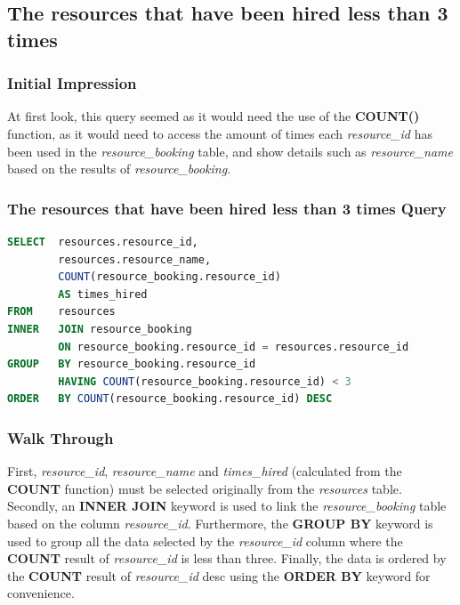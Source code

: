 \documentclass{article}
\begin{document}
\subsection{The resources that have been hired less than 3 times}
\subsubsection{Initial Impression} At first look, this query seemed as it would need the use of the \textbf{COUNT()} function, as it would need to access the amount of times each \textit{resource\_id} has been used in the \textit{resource\_booking} table, and show details such as \textit{resource\_name} based on the results of \textit{resource\_booking}. 

\subsubsection{The resources that have been hired less than 3 times Query}
\begin{lstlisting}[language=sql, caption=The resources that have been hired less than 3 times Query, style=mystyle]
SELECT  resources.resource_id, 
        resources.resource_name, 
        COUNT(resource_booking.resource_id) 
        AS times_hired 
FROM    resources
INNER   JOIN resource_booking 
        ON resource_booking.resource_id = resources.resource_id
GROUP   BY resource_booking.resource_id 
        HAVING COUNT(resource_booking.resource_id) < 3
ORDER   BY COUNT(resource_booking.resource_id) DESC
\end{lstlisting} 

\subsubsection{Walk Through} First, \textit{resource\_id}, \textit{resource\_name} and \textit{times\_hired} (calculated from the \textbf{COUNT} function) must be selected originally from the \textit{resources} table.
\\\newline
Secondly, an \textbf{INNER JOIN} keyword is used to link the \textit{resource\_booking} table based on the column \textit{resource\_id}. Furthermore, the \textbf{GROUP BY} keyword is used to group all the data selected by the \textit{resource\_id} column where the \textbf{COUNT} result of \textit{resource\_id} is less than three. Finally, the data is ordered by the \textbf{COUNT} result of \textit{resource\_id} \acrshort{desc} using the \textbf{ORDER BY} keyword for convenience.
\end{document}
